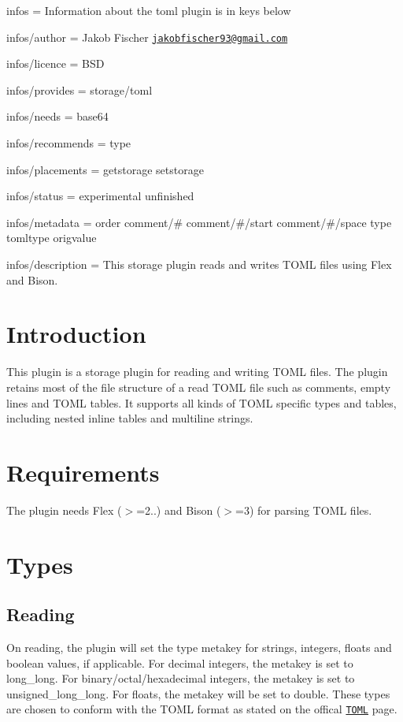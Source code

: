
\begin{DoxyItemize}
\item infos = Information about the toml plugin is in keys below
\item infos/author = Jakob Fischer \href{mailto:jakobfischer93@gmail.com}{\tt jakobfischer93@gmail.\+com}
\item infos/licence = B\+SD
\item infos/provides = storage/toml
\item infos/needs = base64
\item infos/recommends = type
\item infos/placements = getstorage setstorage
\item infos/status = experimental unfinished
\item infos/metadata = order comment/\# comment/\#/start comment/\#/space type tomltype origvalue
\item infos/description = This storage plugin reads and writes T\+O\+ML files using Flex and Bison.
\end{DoxyItemize}\hypertarget{autotoc_md635_src_plugins_toml_README_md}{}\section{Introduction}\label{autotoc_md635_src_plugins_toml_README_md}
This plugin is a storage plugin for reading and writing T\+O\+ML files. The plugin retains most of the file structure of a read T\+O\+ML file such as comments, empty lines and T\+O\+ML tables. It supports all kinds of T\+O\+ML specific types and tables, including nested inline tables and multiline strings.\hypertarget{autotoc_md635_autotoc_md636}{}\section{Requirements}\label{autotoc_md635_autotoc_md636}
The plugin needs Flex ($>$=2..) and Bison ($>$=3) for parsing T\+O\+ML files.\hypertarget{autotoc_md635_autotoc_md637}{}\section{Types}\label{autotoc_md635_autotoc_md637}
\hypertarget{autotoc_md635_autotoc_md638}{}\subsection{Reading}\label{autotoc_md635_autotoc_md638}
On reading, the plugin will set the {\ttfamily type} metakey for strings, integers, floats and boolean values, if applicable. For decimal integers, the metakey is set to {\ttfamily long\+\_\+long}. For binary/octal/hexadecimal integers, the metakey is set to {\ttfamily unsigned\+\_\+long\+\_\+long}. For floats, the metakey will be set to {\ttfamily double}. These types are chosen to conform with the T\+O\+ML format as stated on the offical \href{https://toml.io/en/v1.0.0-rc.1}{\tt T\+O\+ML} page.

